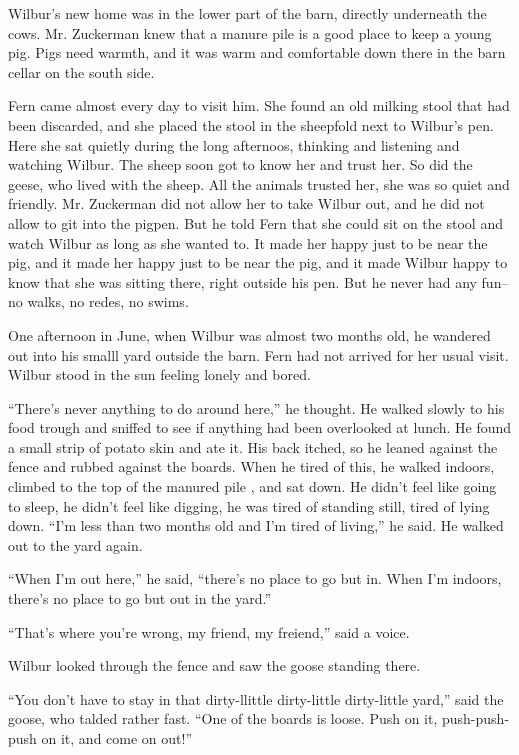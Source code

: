 \documentclass[a4paper, oneside]{book}
\begin{document}
Wilbur's new home was in the lower part of the barn, directly
underneath the cows. Mr. Zuckerman knew that a manure pile is a  
good place to keep a young pig. Pigs need warmth, and it was
warm and comfortable down there in the barn cellar on the south
side. 

Fern came almost every day to visit him. She found an old milking
stool that had been discarded, and she placed the stool in the
sheepfold next to Wilbur's pen. Here she sat quietly during the
long afternoos, thinking and listening and watching Wilbur. The
sheep soon got to know her and trust her. So did the geese, who
lived with the sheep. All the animals trusted her, she was so quiet
and friendly. Mr. Zuckerman did not allow her to take Wilbur out,
and he did not allow to git into the pigpen. But he told Fern that
she could sit on the stool and watch Wilbur as long as she wanted
to. It made her happy just to be near the pig, and it made her
happy just to be near the pig, and it made Wilbur happy to know
that she was sitting there, right outside his pen. But he never had
any fun--no walks, no redes, no swims. 

One afternoon in June, when Wilbur was almost two months old,
he wandered out into his smalll yard outside the barn. Fern had
not arrived for her usual visit. Wilbur stood in the sun feeling
lonely and bored.

 ``There's never anything to do around here,'' he thought. He
walked slowly to his food trough and sniffed to see if anything had  
been overlooked at lunch. He found a small strip of potato skin and
ate it. His back itched, so he leaned against the fence and rubbed
against the boards. When he tired of this, he walked indoors, 
climbed to the top of the manured pile , and sat down. He didn't
feel like going to sleep, he didn't feel like digging, he was tired of
standing still, tired of lying down. ``I'm less than two months old
and I'm tired of living,'' he said. He walked out to the yard again.

 ``When I'm out here,'' he said, ``there's no place to go but in. When
I'm indoors, there's no place to go but out in the yard.'' 
 
 ``That's where you're wrong, my friend, my freiend,'' said a voice.
 
 Wilbur looked through the fence and saw the goose standing there.
 
 ``You don't have to stay in that dirty-llittle dirty-little dirty-little
yard,'' said the goose, who talded rather fast. ``One of the boards is
loose. Push on it, push-push-push on it, and come on out!''                            
\end{document}
